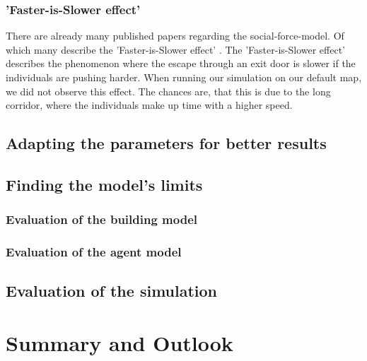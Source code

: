 \documentclass[11pt]{article}
\begin{document}
\subsubsection{'Faster-is-Slower effect'}%
There are already many published papers regarding the social-force-model. Of which many describe the 'Faster-is-Slower effect' \cite{Helbing}. The 'Faster-is-Slower effect' describes the phenomenon where the escape through an exit door is slower if the individuals are pushing harder. When running our simulation on our default map, we did not observe this effect. The chances are, that this is due to the long corridor, where the individuals make up time with a higher speed.

\subsection{Adapting the parameters for better results}

\subsection{Finding the model's limits}

\subsubsection{Evaluation of the building model}
\subsubsection{Evaluation of the agent model}

\subsection{Evaluation of the simulation}

\section{Summary and Outlook}





\end{document}
